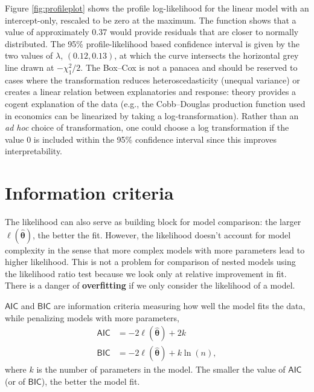 \documentclass[
  11pt,
  letterpaper,
]{book}
\theoremstyle{definition}
\theoremstyle{definition}
\theoremstyle{definition}
\theoremstyle{remark}
\begin{document}
Figure \ref{fig:profileplot} shows the profile log-likelihood for the linear model with an intercept-only, rescaled to be zero at the maximum. The function shows that a value of approximately 0.37 would provide residuals that are closer to normally distributed. The 95\% profile-likelihood based confidence interval is given by the two values of \(\lambda\), \((0.12, 0.13)\), at which the curve intersects the horizontal grey line drawn at \(-\chi^2_1/2\). The Box--Cox is not a panacea and should be reserved to cases where the transformation reduces heteroscedasticity (unequal variance) or creates a linear relation between explanatories and response: theory provides a cogent explanation of the data (e.g., the Cobb--Douglas production function used in economics can be linearized by taking a log-transformation). Rather than an \emph{ad hoc} choice of transformation, one could choose a log transformation if the value \(0\) is included within the 95\% confidence interval since this improves interpretability.

\hypertarget{information-criteria}{%
\section{Information criteria}\label{information-criteria}}

The likelihood can also serve as building block for model comparison: the larger \(\ell(\boldsymbol{\widehat{\theta}})\), the better the fit. However, the likelihood doesn't account for model complexity in the sense that more complex models with more parameters lead to higher likelihood. This is not a problem for comparison of nested models using the likelihood ratio test because we look only at relative improvement in fit. There is a danger of \textbf{overfitting} if we only consider the likelihood of a model.

\(\mathsf{AIC}\) and \(\mathsf{BIC}\) are information criteria measuring how well the model fits the data, while penalizing models with more parameters,
\begin{align*}
\mathsf{AIC}&=-2\ell(\widehat{\boldsymbol{\theta}})+2k \\
\mathsf{BIC}&=-2\ell(\widehat{\boldsymbol{\theta}})+k\ln(n),
\end{align*}
where \(k\) is the number of parameters in the model. The smaller the value of \(\mathsf{AIC}\) (or of \(\mathsf{BIC}\)), the better the model fit.
\end{document}
